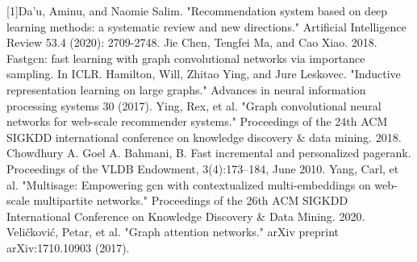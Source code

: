 [1]Da’u, Aminu, and Naomie Salim. "Recommendation system based on deep learning methods: a systematic review and new directions." Artificial Intelligence Review 53.4 (2020): 2709-2748.
\newline[2]Jie Chen, Tengfei Ma, and Cao Xiao. 2018. Fastgcn: fast learning with graph convolutional networks via importance sampling. In ICLR.
\newline[3] Hamilton, Will, Zhitao Ying, and Jure Leskovec. "Inductive representation learning on large graphs." Advances in neural information processing systems 30 (2017).
\newline[4] Ying, Rex, et al. "Graph convolutional neural networks for web-scale recommender systems." Proceedings of the 24th ACM SIGKDD international conference on knowledge discovery \& data mining. 2018.
\newline[5] Chowdhury A. Goel A. Bahmani, B. Fast incremental and personalized pagerank. Proceedings of the VLDB Endowment, 3(4):173–184, June 2010. 
\newline[6]Yang, Carl, et al. "Multisage: Empowering gcn with contextualized multi-embeddings on web-scale multipartite networks." Proceedings of the 26th ACM SIGKDD International Conference on Knowledge Discovery \& Data Mining. 2020.
\newline[7] Veličković, Petar, et al. "Graph attention networks." arXiv preprint arXiv:1710.10903 (2017).